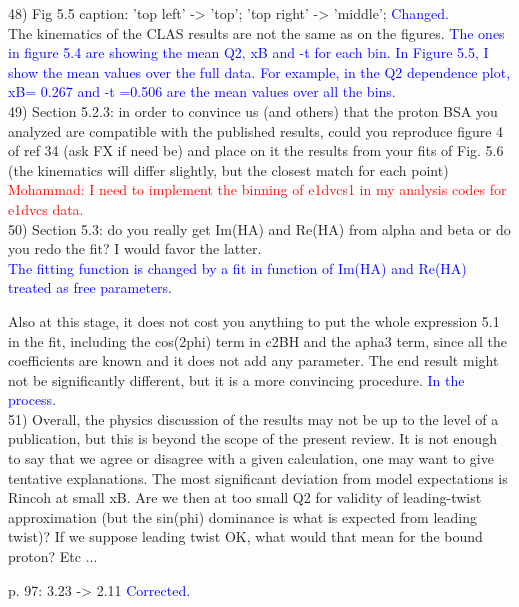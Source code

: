 48) Fig 5.5 caption: 'top left' -> 'top'; 'top right' -> 'middle'; 
\textcolor{blue}{Changed.}\\
The kinematics of the CLAS results are not the same as on the figures.  
\textcolor{blue}{  The ones in figure 5.4 are showing the mean Q2, xB and -t 
for each bin. In Figure 5.5, I show the mean values over the full data. For 
example, in the Q2 dependence plot, xB= 0.267 and -t =0.506 are the mean values 
over all the bins.}\\   

49) Section 5.2.3: in order to convince us (and others) that the proton BSA you 
analyzed are compatible with the published results, could you reproduce figure 
4 of ref 34 (ask FX if need be) and place on it the results from your fits of 
Fig. 5.6 (the kinematics will differ slightly, but the closest match for each 
point)\\
\textcolor{red}{Mohammad: I need to implement the binning of e1dvcs1 in my 
analysis codes for e1dvcs data.}\\ 

50) Section 5.3: do you really get Im(HA) and Re(HA) from alpha and beta or do 
you redo the fit? I would favor the latter.  \\
\textcolor{blue}{ The fitting function is changed by a fit in function of
Im(HA) and Re(HA) treated as free parameters.} 

Also at this stage, it does not cost you anything to put the whole expression 
5.1 in the fit, including the cos(2phi) term in c2BH and the apha3 term, since 
all the coefficients are known and it does not add any parameter. The end 
result might not be significantly different, but it is a more convincing 
procedure. \textcolor{blue}{ In the process.}\\

51) Overall, the physics discussion of the results may not be up to the level of a 
publication, but this is beyond the scope of the present review. It is not 
enough to say that we agree or disagree with a given calculation, one may want 
to give tentative explanations. The most significant deviation from model 
expectations is R{incoh} at small xB. Are we then at too small Q2 for validity 
of leading-twist approximation (but the sin(phi) dominance is what is expected 
from leading twist)? If we suppose leading twist OK, what would that mean for 
the bound proton? Etc ...

p. 97: 3.23 -> 2.11 
\textcolor{blue}{ Corrected.}\\

